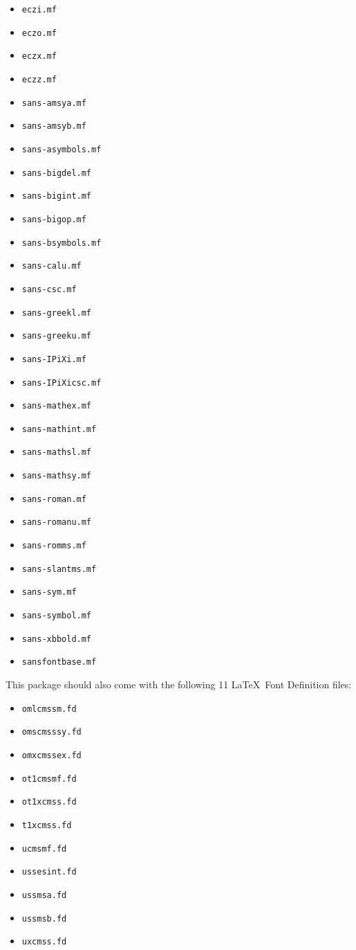 \documentclass{amsart}
\begin{document}
\begin{itemize}[leftmargin=*]
\item \texttt{eczi.mf}
\item \texttt{eczo.mf}
\item \texttt{eczx.mf}
\item \texttt{eczz.mf}
\item \texttt{sans-amsya.mf}
\item \texttt{sans-amsyb.mf}
\item \texttt{sans-asymbols.mf}
\item \texttt{sans-bigdel.mf}
\item \texttt{sans-bigint.mf}
\item \texttt{sans-bigop.mf}
\item \texttt{sans-bsymbols.mf}
\item \texttt{sans-calu.mf}
\item \texttt{sans-csc.mf}
\item \texttt{sans-greekl.mf}
\item \texttt{sans-greeku.mf}
\item \texttt{sans-IPiXi.mf}
\item \texttt{sans-IPiXicsc.mf}
\item \texttt{sans-mathex.mf}
\item \texttt{sans-mathint.mf}
\item \texttt{sans-mathsl.mf}
\item \texttt{sans-mathsy.mf}
\item \texttt{sans-roman.mf}
\item \texttt{sans-romanu.mf}
\item \texttt{sans-romms.mf}
\item \texttt{sans-slantms.mf}
\item \texttt{sans-sym.mf}
\item \texttt{sans-symbol.mf}
\item \texttt{sans-xbbold.mf}
\item \texttt{sansfontbase.mf}
\end{itemize}

This package should also come with the following 11 \LaTeX\ Font Definition files:

\begin{itemize}[leftmargin=*]
\item \texttt{omlcmssm.fd}
\item \texttt{omscmsssy.fd}
\item \texttt{omxcmssex.fd}

\item \texttt{ot1cmsmf.fd}
\item \texttt{ot1xcmss.fd}
\item \texttt{t1xcmss.fd}

\item \texttt{ucmsmf.fd}
\item \texttt{ussesint.fd}
\item \texttt{ussmsa.fd}
\item \texttt{ussmsb.fd}
\item \texttt{uxcmss.fd}
\end{itemize}
\end{document}
